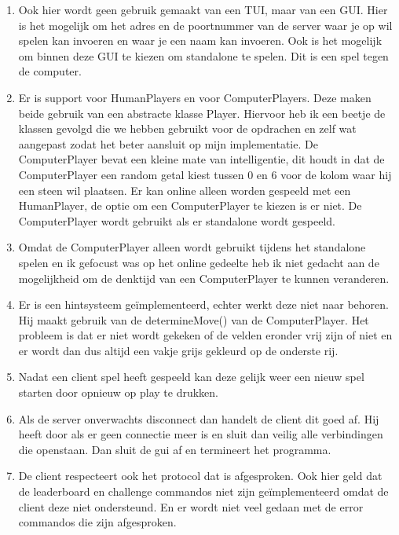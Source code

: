 \documentclass[12pt]{article}
\begin{document}
\begin{enumerate}
 \item Ook hier wordt geen gebruik gemaakt van een TUI, maar van een GUI. Hier is het mogelijk om het adres en de poortnummer van de server waar je op wil spelen kan invoeren en waar je een naam kan invoeren. Ook is het mogelijk om binnen deze GUI te kiezen om standalone te spelen. Dit is een spel tegen de computer.
 \item Er is support voor HumanPlayers en voor ComputerPlayers. Deze maken beide gebruik van een abstracte klasse Player. Hiervoor heb ik een beetje de klassen gevolgd die we hebben gebruikt voor de opdrachen en zelf wat aangepast zodat het beter aansluit op mijn implementatie. De ComputerPlayer bevat een kleine mate van intelligentie, dit houdt in dat de ComputerPlayer een random getal kiest tussen 0 en 6 voor de kolom waar hij een steen wil plaatsen. Er kan online alleen worden gespeeld met een HumanPlayer, de optie om een ComputerPlayer te kiezen is er niet. De ComputerPlayer wordt gebruikt als er standalone wordt gespeeld.
 \item Omdat de ComputerPlayer alleen wordt gebruikt tijdens het standalone spelen en ik gefocust was op het online gedeelte heb ik niet gedacht aan de mogelijkheid om de denktijd van een ComputerPlayer te kunnen veranderen.
 \item Er is een hintsysteem ge\"implementeerd, echter werkt deze niet naar behoren. Hij maakt gebruik van de determineMove() van de ComputerPlayer. Het probleem is dat er niet wordt gekeken of de velden eronder vrij zijn of niet en er wordt dan dus altijd een vakje grijs gekleurd op de onderste rij.
 \item Nadat een client spel heeft gespeeld kan deze gelijk weer een nieuw spel starten door opnieuw op play te drukken.
 \item Als de server onverwachts disconnect dan handelt de client dit goed af. Hij heeft door als er geen connectie meer is en sluit dan veilig alle verbindingen die openstaan. Dan sluit de gui af en termineert het programma.
 \item De client respecteert ook het protocol dat is afgesproken. Ook hier geld dat de leaderboard en challenge commandos niet zijn ge\"implementeerd omdat de client deze niet ondersteund. En er wordt niet veel gedaan met de error commandos die zijn afgesproken.
\end{enumerate}
\end{document}
